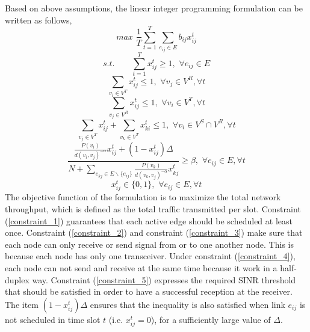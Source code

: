 \documentclass[conference]{IEEEtran}
\begin{document}
Based on above assumptions, the linear integer programming
formulation can be written as follows,
\begin{displaymath} \label{object function}
    max\,\, \frac{1}{T}\sum_{t=1}^{T}\sum_{e_{ij}\in E} b_{ij}x_{ij}^t
\end{displaymath}
\begin{equation} \label{constraint_1}
    s.t.\,\,\,\,\,\,\,\,\,\,\,\,\sum_{t=1}^{T} x_{ij}^t \geq 1, \,\,\forall e_{ij}\in E
\end{equation}
\begin{equation} \label{constraint_2}
    \sum_{v_i\in V^T} x_{ij}^t \leq 1, \,\,\forall v_j\in V^R, \forall t
\end{equation}
\begin{equation} \label{constraint_3}
    \sum_{v_j\in V^R} x_{ij}^t \leq 1, \,\,\forall v_i\in V^T, \forall t
\end{equation}
\begin{equation} \label{constraint_4}
    \sum_{v_j\in V^T} x_{ij}^t +\sum_{v_k\in V^T} x_{ki}^t \leq 1, \,\,\forall v_i\in V^S\cap
    V^R, \forall t
\end{equation}
\begin{equation} \label{constraint_5}
    \frac{\frac{P(v_i)}{d(v_{i},v_{j})^{-\alpha}}x_{ij}^t+(1-x_{ij}^t)\Delta}{N+\sum_{e_{kj}\in E\backslash \{e_{ij}\}} {\frac{P(v_{k})}{d(v_{k},v_{j})^{-\alpha}}x_{kj}^t}} \geq \beta,
\,\,\forall e_{ij}\in E, \forall t
\end{equation}
\begin{equation} \label{constraint_7}
    x_{ij}^t \in \{0,1\}, \,\,\forall e_{ij}\in E, \forall t
\end{equation}
The objective function of the formulation is to maximize the total
network throughput, which is defined as the total traffic
transmitted per slot. Constraint (\ref{constraint_1}) guarantees
that each active edge should be scheduled at least once. Constraint
(\ref{constraint_2}) and constraint (\ref{constraint_3}) make sure
that each node can only receive or send signal from or to one
another node. This is because each node has only one transceiver.
Under constraint (\ref{constraint_4}), each node can not send and
receive at the same time because it work in a half-duplex way.
Constraint (\ref{constraint_5}) expresses the required SINR
threshold that should be satisfied in order to have a successful
reception at the receiver. The item $(1-x_{ij}^t)\Delta$ ensures
that the inequality is also satisfied when link $e_{ij}$ is not
scheduled in time slot $t$ (i.e. $x_{ij}^t=0$), for a sufficiently
large value of $\Delta$.
\end{document}
